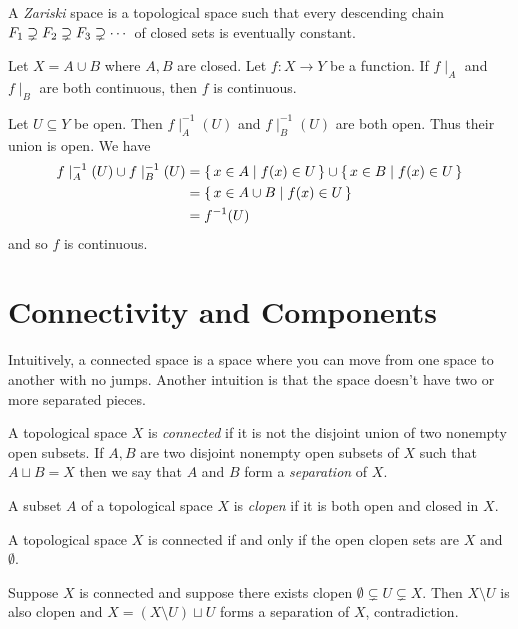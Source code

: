 \documentclass[letterpaper, 11pt]{article}
\begin{document}
\begin{defn}
  A \emph{Zariski} space is a topological space such that every descending chain $F_{1} \supsetneq F_{2} \supsetneq F_{3} \supsetneq \cdots$ of closed sets is eventually constant.
\end{defn}

\begin{exercise}
  Let $X = A \cup B$ where $A, B$ are closed.
  Let $f\colon X \to Y$ be a function.
  If $f\mid_{A}$ and $f\mid_{B}$ are both continuous, then $f$ is continuous.
\end{exercise}
\begin{pf}
  Let $U \subseteq Y$ be open.
  Then $f\mid_{A}^{-1}(U)$ and $f\mid_{B}^{-1}(U)$ are both open.
  Thus their union is open.
  We have
  \begin{align*}
    f\mid_{A}^{-1}(U) \cup f\mid_{B}^{-1}(U) &= \set{x \in A | f(x) \in U} \cup \set{x \in B | f(x) \in U} \\
                                             &=  \set{x \in A \cup B | f(x) \in U} \\
    &= f^{-1}(U)
  \end{align*}
  and so $f$ is continuous.
\end{pf}

\clearpage

\section{Connectivity and Components}

Intuitively, a connected space is a space where you can move from one space to another with no jumps.
Another intuition is that the space doesn't have two or more separated pieces.

\begin{defn}
  A topological space $X$ is \emph{connected} if it is not the disjoint union of two nonempty open subsets.
  If $A, B$ are two disjoint nonempty open subsets of $X$ such that $A \sqcup B = X$ then we say that $A$ and $B$ form a \emph{separation} of $X$.
\end{defn}

\begin{defn}
  A subset $A$ of a topological space $X$ is \emph{clopen} if it is both open and closed in $X$.
\end{defn}

\begin{prop}
  A topological space $X$ is connected if and only if the open clopen sets are $X$ and $\emptyset$.
\end{prop}
\begin{prop}
  Suppose $X$ is connected and suppose there exists clopen $\emptyset \subsetneq U \subsetneq X$.
  Then $X \setminus U$ is also clopen and $X = (X \setminus U) \sqcup U$ forms a separation of $X$, contradiction.
\end{prop}
\end{document}
